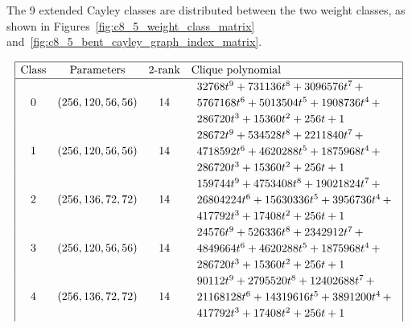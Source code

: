\documentclass[12pt,a4paper]{article}
\begin{document}
The 9 extended Cayley classes are distributed between the two weight classes,
as shown in Figures~\ref{fig:c8_5_weight_class_matrix} and~\ref{fig:c8_5_bent_cayley_graph_index_matrix}.
\begin{table}[!bhpt] %
%
\small{}
\begin{align*}
\def\arraystretch{1.2}
\begin{array}{|cccl|}
\hline
\text{Class} &
\text{Parameters} &
\text{2-rank} &
\text{Clique polynomial}
\\
\hline
0 &
(256, 120, 56, 56) &
14 &
\begin{array}{l}
32768t^{9} + 731136t^{8} + 3096576t^{7}
\,+
\\
 5767168t^{6} + 5013504t^{5} + 1908736t^{4}
\,+
\\
 286720t^{3} + 15360t^{2} + 256t + 1
\end{array}
\\
1 &
(256, 120, 56, 56) &
14 &
\begin{array}{l}
28672t^{9} + 534528t^{8} + 2211840t^{7}
\,+
\\
 4718592t^{6} + 4620288t^{5} + 1875968t^{4}
\,+
\\
 286720t^{3} + 15360t^{2} + 256t + 1
\end{array}
\\
2 &
(256, 136, 72, 72) &
14 &
\begin{array}{l}
159744t^{9} + 4753408t^{8} + 19021824t^{7}
\,+
\\
 26804224t^{6} + 15630336t^{5} + 3956736t^{4}
\,+
\\
 417792t^{3} + 17408t^{2} + 256t + 1
\end{array}
\\
3 &
(256, 120, 56, 56) &
14 &
\begin{array}{l}
24576t^{9} + 526336t^{8} + 2342912t^{7}
\,+
\\
 4849664t^{6} + 4620288t^{5} + 1875968t^{4}
\,+
\\
 286720t^{3} + 15360t^{2} + 256t + 1
\end{array}
\\
4 &
(256, 136, 72, 72) &
14 &
\begin{array}{l}
90112t^{9} + 2795520t^{8} + 12402688t^{7}
\,+
\\
 21168128t^{6} + 14319616t^{5} + 3891200t^{4}
\,+
\\
 417792t^{3} + 17408t^{2} + 256t + 1
\end{array}
\\

\end{array}
\end{align*}
\end{table}
\end{document}
